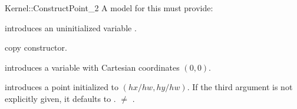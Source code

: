 \begin{ccRefFunctionObjectConcept}{Kernel::ConstructPoint_2}
A model for this must provide:



\ccHidden {}
             {introduces an uninitialized variable .}

\ccHidden {}
            {copy constructor.}

            {introduces a variable  with Cartesian coordinates
              $(0,0)$.}

\ccHidden{}
            {introduces a point  initialized to $(hx/hw,hy/hw)$.
             If the third argument is not explicitly given, it defaults
             to .
             \ccPrecond {} $\neq$ . }

\ccSeeAlso
{} \\

\end{ccRefFunctionObjectConcept}
